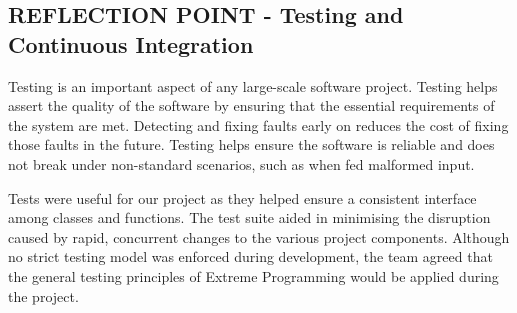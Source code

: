\documentclass{l3proj}
\begin{document}
\subsection{REFLECTION POINT - Testing and Continuous Integration}
\label{testing}

Testing is an important aspect of any large-scale software project.
Testing helps assert the quality of the software by ensuring that the essential requirements of the system are met.
Detecting and fixing faults early on reduces the cost of fixing those faults in the future.
Testing helps ensure the software is reliable and does not break under non-standard scenarios, such as when fed malformed input.

Tests were useful for our project as they helped ensure a consistent interface among classes and functions. The test suite aided in minimising the disruption caused by rapid, concurrent changes to the various project components.
Although no strict testing model was enforced during development, the team agreed that the general testing principles of Extreme Programming would be applied during the project.
\end{document}
